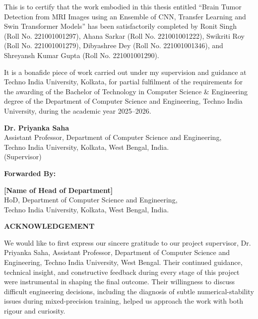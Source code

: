 \documentclass[12pt,a4paper,oneside]{report}
\begin{document}
This is to certify that the work embodied in this thesis entitled ``Brain Tumor Detection from MRI Images using an Ensemble of CNN, Transfer Learning and Swin Transformer Models''
has been satisfactorily completed by Ronit Singh (Roll No. 221001001297),
Ahana Sarkar (Roll No. 221001001222),
Swikriti Roy (Roll No. 221001001279),
Dibyashree Dey (Roll No. 221001001346),
and Shreyansh Kumar Gupta (Roll No. 221001001290).

It is a bonafide piece of work
carried out under my supervision and guidance at Techno India University, Kolkata,
for partial fulfilment of the requirements for the awarding of the Bachelor of Technology
in Computer Science \& Engineering degree of the Department of
Computer Science and Engineering, Techno India University, during the academic year
2025--2026.

\vspace{2cm}

\textbf{Dr. Priyanka Saha}\\
Assistant Professor, Department of Computer Science and Engineering,\\
Techno India University, Kolkata, West Bengal, India.\\
(Supervisor)

\vspace{2cm}

\textbf{Forwarded By:}

\vspace{1cm}

\textbf{[Name of Head of Department]}\\
HoD, Department of Computer Science and Engineering,\\
Techno India University, Kolkata, West Bengal, India.


\newpage
\thispagestyle{empty}
\mbox{}


\newpage

\begin{center}
{\Large \textbf{ACKNOWLEDGEMENT}}
\end{center}

\vspace{1cm}

We would like to first express our sincere gratitude to our project supervisor,
Dr. Priyanka Saha, Assistant Professor, Department of Computer Science and Engineering,
Techno India University, West Bengal. Their continued guidance, technical insight, and
constructive feedback during every stage of this project were instrumental in shaping the
final outcome. Their willingness to discuss difficult engineering decisions, including the
diagnosis of subtle numerical-stability issues during mixed-precision training, helped us
approach the work with both rigour and curiosity.
\end{document}
